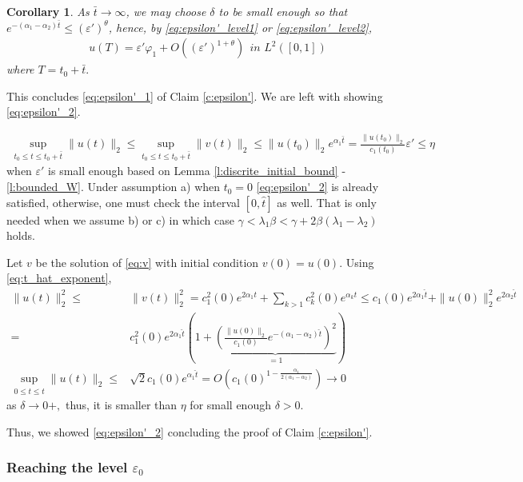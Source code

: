 \documentclass{article}
\newcommand{\1}[1]{{\mathds{1}}_{\left\{#1\right\}}}
\newtheorem{corollary}{Corollary}
\begin{document}
\begin{corollary}
\label{cor:t_bar}
As $\bar{t} \to \infty$, we may choose $\delta$ to be small enough so that $e^{-(\alpha_1-\alpha_2)\bar{t}} \leq (\varepsilon')^{\theta}$, hence, by \eqref{eq:epsilon'_level1} or \eqref{eq:epsilon'_level2},
\begin{align*}
	u(T)=\varepsilon' \varphi_1+O\left(\left(\varepsilon' \right)^{1+\theta} \right)  \ \ \textit{in } L^2([0,1]) 
\end{align*}  
where  $T=t_0+\bar{t}.$
\end{corollary}


This concludes \eqref{eq:epsilon'_1} of Claim \ref{c:epsilon'}. We are left with showing \eqref{eq:epsilon'_2}.

\begin{align*}
\sup_{t_0 \leq t \leq t_0+\bar{t}}\|u(t) \|_2 \leq \sup_{t_0 \leq t \leq t_0+ \bar{t}} \|v(t) \|_2 \leq \|u(t_0) \|_2e^{\alpha_1 \bar{t}}=\frac{\|u(t_0) \|_2}{c_1(t_0)}\varepsilon' \leq \eta
\end{align*}
when $\varepsilon'$ is small enough based on Lemma \ref{l:discrite_initial_bound} - \ref{l:bounded_W}. Under assumption a) when $t_0=0$   \eqref{eq:epsilon'_2} is already satisfied, otherwise, one must check the interval $[0,\hat{t}]$ as well. That is only needed when we assume b) or c) in which case $\gamma<\lambda_1 \beta<\gamma +2\beta(\lambda_1-\lambda_2)$ holds.

Let $v$ be the solution of \eqref{eq:v} with initial condition $v(0)=u(0).$ Using \eqref{eq:t_hat_exponent},
\begin{align}
\nonumber
\|u(t) \|_2^2 \leq& \|v(t) \|_2^2=c_1^2(0)e^{2\alpha_1 t}+\sum_{k>1}c_k^2(0)e^{\alpha_k t} \leq c_1(0)e^{2\alpha_{1}\hat{t}}+\|u(0)\|_2^2 e^{2\alpha_2 \hat{t}} \\
\nonumber
=&c_1^2(0)e^{2\alpha_1 \hat{t}} \left(1+\underbrace{ \left(\frac{\|u(0) \|_2}{c_1(0)}e^{-(\alpha_1-\alpha_2)\hat{t}} \right)^2}_{=1} \right)\\
\label{eta_bound}
\sup_{0 \leq t \leq \hat{t}}\|u(t) \|_2 \leq & \sqrt{2} c_1(0)e^{\alpha_1\hat{t}}=O \left(c_1(0)^{1-\frac{\alpha_1}{2(\alpha_1-\alpha_2)}}\right) \to 0
\end{align} 
as $\delta \to 0+,$ thus, it is smaller than $\eta$ for small enough $\delta>0.$

Thus, we showed \eqref{eq:epsilon'_2} concluding the proof of Claim \ref{c:epsilon'}.

\subsubsection{Reaching the level $\varepsilon_0$}
\label{s:epsilon_0}
\end{document}
